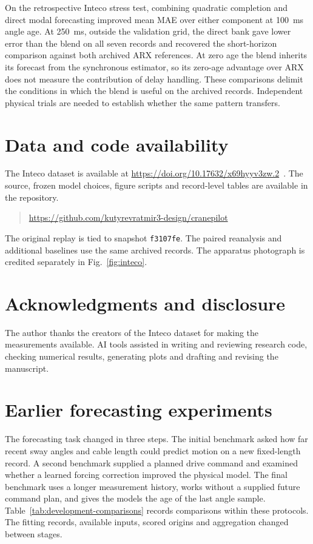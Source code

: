 On the retrospective Inteco stress test, combining quadratic completion and direct modal forecasting improved mean MAE over either component at 100~ms angle age. At 250~ms, outside the validation grid, the direct bank gave lower error than the blend on all seven records and recovered the short-horizon comparison against both archived ARX references. At zero age the blend inherits its forecast from the synchronous estimator, so its zero-age advantage over ARX does not measure the contribution of delay handling. These comparisons delimit the conditions in which the blend is useful on the archived records. Independent physical trials are needed to establish whether the same pattern transfers.

\section*{Data and code availability}

The Inteco dataset is available at \url{https://doi.org/10.17632/x69hyyv3zw.2}~\cite{mendeley2025}. The source, frozen model choices, figure scripts and record-level tables are available in the repository.
\begin{quote}\url{https://github.com/kutyrevratmir3-design/cranepilot}\end{quote}
The original replay is tied to snapshot \texttt{f3107fe}. The paired reanalysis and additional baselines use the same archived records. The apparatus photograph is credited separately in Fig.~\ref{fig:inteco}.

\section*{Acknowledgments and disclosure}

The author thanks the creators of the Inteco dataset for making the measurements available. AI tools assisted in writing and reviewing research code, checking numerical results, generating plots and drafting and revising the manuscript.

\appendix
\section{Earlier forecasting experiments}
\label{app:development}

The forecasting task changed in three steps. The initial benchmark asked how far recent sway angles and cable length could predict motion on a new fixed-length record. A second benchmark supplied a planned drive command and examined whether a learned forcing correction improved the physical model. The final benchmark uses a longer measurement history, works without a supplied future command plan, and gives the models the age of the last angle sample. Table~\ref{tab:development-comparisons} records comparisons within these protocols. The fitting records, available inputs, scored origins and aggregation changed between stages.

